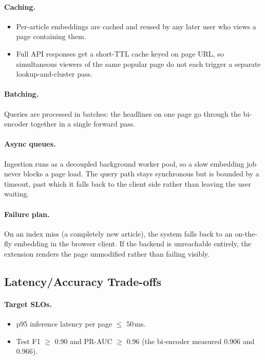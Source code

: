 \documentclass[11pt,letterpaper]{article}
\begin{document}
\paragraph{Caching.}
\begin{itemize}
\item Per-article embeddings are cached and reused by any later user who views a page containing them.
\item Full API responses get a short-TTL cache keyed on page URL, so simultaneous viewers of the same popular page do not each trigger a separate lookup-and-cluster pass.
\end{itemize}

\paragraph{Batching.}
Queries are processed in batches: the headlines on one page go through the bi-encoder together in a single forward pass.

\paragraph{Async queues.}
Ingestion runs as a decoupled background worker pool, so a slow embedding job never blocks a page load. The query path stays synchronous but is bounded by a timeout, past which it falls back to the client side rather than leaving the user waiting.

\paragraph{Failure plan.}
On an index miss (a completely new article), the system falls back to an on-the-fly embedding in the browser client. If the backend is unreachable entirely, the extension renders the page unmodified rather than failing visibly.

\subsection{Latency/Accuracy Trade-offs}

\paragraph{Target SLOs.}
\begin{itemize}
\item p95 inference latency per page $\leq$ 50\,ms.
\item Test F1 $\geq$ 0.90 and PR-AUC $\geq$ 0.96 (the bi-encoder measured 0.906 and 0.966).
\end{itemize}
\end{document}
